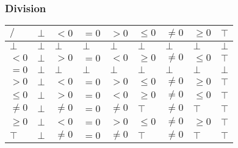 \documentclass[aspectratio=169]{beamer}
\begin{document}
        \begin{frame}
            \frametitle{Division}
        \begin{table}[]
            \begin{tabular}{|l|l|l|l|l|l|l|l|l|}
            \hline
            $/$     & $\bot$ & $<0$    & $=0$   & $>0$    & $\le 0$ & $\ne 0$ & $\ge 0$ & $\top$ \\ \hline
            $\bot$  & $\bot$ & $\bot$  & $\bot$ & $\bot$  & $\bot$  & $\bot$  & $\bot$  & $\bot$ \\ \hline
            $<0$    & $\bot$ & $>0$    & $=0$   & $<0$    & $\ge 0$ & $\ne 0$ & $\le 0$ & $\top$ \\ \hline
            $=0$    & $\bot$ & $\bot$  & $\bot$ & $\bot$  & $\bot$  & $\bot$  & $\bot$  & $\bot$ \\ \hline
            $>0$    & $\bot$ & $<0$    & $=0$   & $>0$    & $\le 0$ & $\ne 0$ & $\ge 0$ & $\top$ \\ \hline
            $\le 0$ & $\bot$ & $>0$    & $=0$   & $<0$    & $\ge 0$ & $\ne 0$ & $\le 0$ & $\top$ \\ \hline
            $\ne 0$ & $\bot$ & $\ne 0$ & $=0$   & $\ne 0$ & $\top$  & $\ne 0$ & $\top$  & $\top$ \\ \hline
            $\ge 0$ & $\bot$ & $<0$    & $=0$   & $>0$    & $\le 0$ & $\ne 0$ & $\ge 0$ & $\top$ \\ \hline
            $\top$  & $\bot$ & $\ne 0$ & $=0$   & $\ne 0$ & $\top$  & $\ne 0$ & $\top$  & $\top$ \\ \hline
            \end{tabular}
            \end{table}
        \end{frame}
\end{document}
